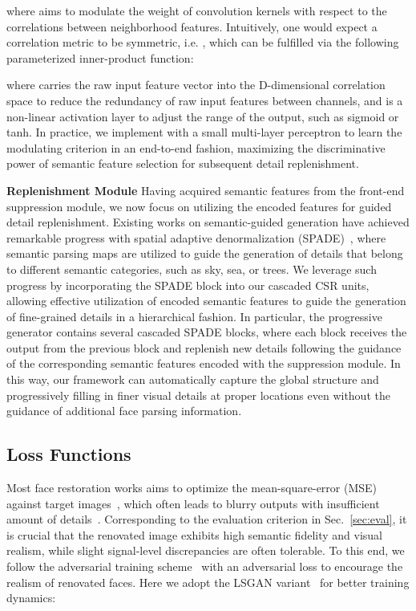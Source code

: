 \documentclass[sigconf]{acmart}
\begin{document}
where  aims to modulate the weight of convolution kernels with respect to the correlations between neighborhood features. Intuitively, one would expect a correlation metric to be symmetric, i.e. , which can be fulfilled via the following parameterized inner-product function:



where  carries the raw input feature vector  into the D-dimensional correlation space to reduce the redundancy of raw input features between channels, and  is a non-linear activation layer to adjust the range of the output, such as sigmoid or tanh. In practice, we implement  with a small multi-layer perceptron to learn the modulating criterion in an end-to-end fashion, maximizing the discriminative power of semantic feature selection for subsequent detail replenishment.

\textbf{Replenishment Module}
Having acquired semantic features from the front-end suppression module, we now focus on utilizing the encoded features for guided detail replenishment. Existing works on semantic-guided generation have achieved remarkable progress with spatial adaptive denormalization (SPADE)~\cite{spade}, where semantic parsing maps are utilized to guide the generation of details that belong to different semantic categories, such as sky, sea, or trees. We leverage such progress by incorporating the SPADE block into our cascaded CSR units, allowing effective utilization of encoded semantic features to guide the generation of fine-grained details in a hierarchical fashion. In particular, the progressive generator contains several cascaded SPADE blocks, where each block receives the output from the previous block and replenish new details following the guidance of the corresponding semantic features encoded with the suppression module. In this way, our framework can automatically capture the global structure and progressively filling in finer visual details at proper locations even without the guidance of additional face parsing information.

\subsection{Loss Functions}\label{sec:loss}
Most face restoration works aims to optimize the mean-square-error (MSE) against target images~\cite{srcnn}\cite{vdsr}\cite{edsr}, which often leads to blurry outputs with insufficient amount of details~\cite{esrgan}.
Corresponding to the evaluation criterion in Sec.~\ref{sec:eval}, it is crucial that the renovated image exhibits high semantic fidelity and visual realism, while slight signal-level discrepancies are often tolerable. To this end, we follow the adversarial training scheme~\cite{gan} with an adversarial loss  to encourage the realism of renovated faces. Here we adopt the LSGAN variant~\cite{lsgan} for better training dynamics:
\end{document}
